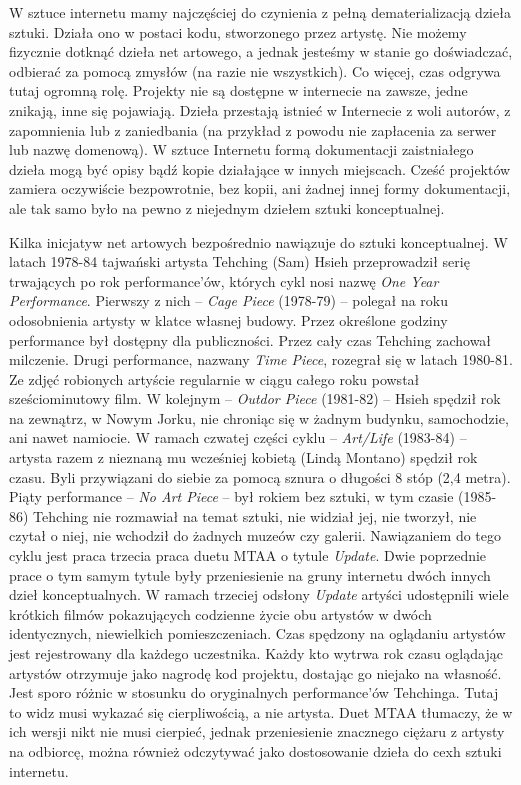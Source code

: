\documentclass[a4paper,12pt,twoside]{article}
\begin{document}
W sztuce internetu mamy najczęściej do czynienia z pełną dematerializacją
dzieła sztuki. Działa ono w postaci kodu, stworzonego przez artystę.
Nie możemy fizycznie dotknąć dzieła net artowego, a jednak jesteśmy w stanie
go doświadczać, odbierać za pomocą zmysłów (na razie nie wszystkich).
Co więcej, czas odgrywa tutaj ogromną rolę. Projekty nie są dostępne
w internecie na zawsze, jedne znikają, inne się pojawiają. Dzieła przestają
istnieć w Internecie z woli autorów, z zapomnienia lub z zaniedbania (na
przykład z powodu nie zapłacenia za serwer lub nazwę domenową). W sztuce
Internetu formą dokumentacji zaistniałego dzieła mogą być opisy bądź kopie
działające w innych miejscach. Cześć projektów zamiera oczywiście bezpowrotnie,
bez kopii, ani żadnej innej formy dokumentacji, ale tak samo było na pewno
z niejednym dziełem sztuki konceptualnej.

Kilka inicjatyw net artowych bezpośrednio nawiązuje do sztuki konceptualnej.
W latach 1978-84 tajwański artysta
Tehching (Sam) Hsieh przeprowadził serię trwających po rok
performance'ów, których cykl nosi nazwę \textit{One Year Performance}.
Pierwszy z nich -- \textit{Cage Piece} (1978-79) -- polegał na roku
odosobnienia artysty w klatce własnej budowy. Przez określone godziny
performance był dostępny dla publiczności. Przez cały czas Tehching zachował
milczenie. Drugi performance, nazwany \textit{Time Piece}, rozegrał się
w latach 1980-81. Ze zdjęć robionych artyście regularnie w ciągu całego roku
powstał sześciominutowy film. W kolejnym -- \textit{Outdor Piece} (1981-82) --
Hsieh spędził rok na zewnątrz, w Nowym Jorku, nie chroniąc się w żadnym
budynku, samochodzie, ani nawet namiocie. W ramach czwatej części cyklu --
\textit{Art/Life} (1983-84) -- artysta razem z nieznaną mu wcześniej kobietą
(Lindą Montano) spędził rok czasu. Byli przywiązani do siebie za pomocą
sznura o długości 8 stóp (2,4 metra). Piąty performance --
\textit{No Art Piece} -- był rokiem bez sztuki,
w tym czasie (1985-86) Tehching nie rozmawiał na temat sztuki, nie widział jej,
nie tworzył, nie czytał o niej, nie wchodził do żadnych muzeów czy galerii.
Nawiązaniem do tego cyklu jest praca trzecia praca duetu MTAA o tytule
\textit{Update}. Dwie poprzednie prace o tym samym tytule były przeniesienie
na gruny internetu dwóch innych dzieł konceptualnych. W ramach trzeciej
odsłony \textit{Update} artyści udostępnili wiele krótkich filmów pokazujących
codzienne życie obu artystów w dwóch identycznych, niewielkich pomieszczeniach.
Czas spędzony na oglądaniu artystów jest rejestrowany dla każdego uczestnika.
Każdy kto wytrwa rok czasu oglądając artystów otrzymuje jako nagrodę kod
projektu, dostając go niejako na własność. Jest sporo różnic w stosunku do
oryginalnych performance'ów Tehchinga. Tutaj to widz musi wykazać się
cierpliwością, a nie artysta. Duet MTAA tłumaczy, że w ich wersji nikt nie
musi cierpieć, jednak przeniesienie znacznego ciężaru z artysty na odbiorcę,
można również odczytywać jako dostosowanie dzieła do cexh sztuki internetu.
\end{document}
